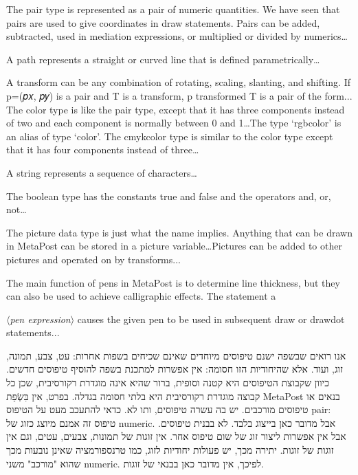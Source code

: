 The pair type is represented as a pair of numeric quantities. We have seen that pairs are used to give coordinates in draw statements. Pairs can be added, subtracted, used in mediation expressions, or multiplied or divided by numerics…

A path represents a straight or curved line that is defined parametrically…

A transform can be any combination of rotating, scaling, slanting, and
shifting. If p=(𝑝𝑥, 𝑝𝑦) is a pair and T is a transform, p transformed T
is a pair of the form...
The color type is like the pair type, except that it has three components
instead of two and each component is normally between 0 and 1…The type
‘rgbcolor’ is an alias of type ‘color’. The cmykcolor type is similar to the
color type except that it has four components instead of three…

A string represents a sequence of characters…

The boolean type has the constants true and false and the operators and, or,
not…

The picture data type is just what the name implies. Anything that can be
drawn in MetaPost can be stored in a picture variable…Pictures can be added to
other pictures and operated on by transforms...

The main function of pens in MetaPost is to determine line thickness, but
they can also be used to achieve calligraphic effects. The statement a
~

$⟨${\itshape pen expression}$⟩$ causes the given pen to be used
in subsequent draw or drawdot statements...

אנו רואים שבשפה ישנם טיפוסים מיוחדים שאינם שכיחים בשפות אחרות: עט, צבע, תמונה,
זוג, ועוד. אלא שהיחודיות הזו חסומה: אין אפשרות למתכנת בשפה להוסיף טיפוסים
חדשים. כיוון שקבוצת הטיפוסים היא קטנה וסופית, ברור שהיא אינה מוגדרת רקורסיבית,
שכן כל קבוצה מוגדרת רקורסיבית היא בלתי חסומה בגדלה. בפרט, אין בִּשְׂפַת MetaPost
בנאים או טיפוסים מורכבים. יש בה עשרה טיפוסים, ותו לא. כדאי להתעכב מעט על
הטיפוס pair: טיפוס זה אמנם מיוצג כזוג של numeric. אבל מדובר כאן בייצוג בלבד. לא
בבנית טיפוסים. אבל אין אפשרות ליצור זוג של שום טיפוס אחר. אין זוגות של תמונות,
צבעים, עטים, וגם אין זוגות של זוגות. יתירה מכך, יש פעולות יחודיות לזוג, כמו
טרנספורמציה שאינן נובעות מכך שהוא "מורכב" משני numeric. לפיכך, אין מדובר כאן
בבנאי של זוגות.

